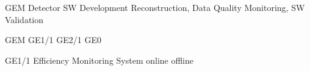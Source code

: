 \makeatletter
  \graphicspath{ {@path} }
\makeatother

\begin{frame}[fragile]{GEM Detector SW Development}
  Reconstruction, Data Quality Monitoring, SW Validation
\end{frame}

\begin{frame}[fragile]{GEM}
  GE1/1 GE2/1 GE0
\end{frame}

\begin{frame}[fragile]{GE1/1 Efficiency Monitoring System}
  online offline
\end{frame}
